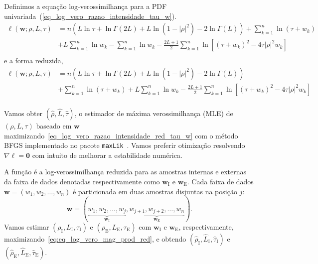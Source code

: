Definimos a equação log-verossimilhança para a PDF univariada~(\ref{eq_log_vero_razao_intensidade_tau_w}).
\begin{equation}\nonumber
\begin{split}
    \ell(\bm w;\rho, L, \tau)&=n\left(L\ln\tau + \ln\Gamma(2L)+L\ln(1-|\rho|^2)-2\ln\Gamma(L)\right)+\sum_{k=1}^{n}\ln(\tau+w_k)\\
                         &+L\sum_{k=1}^{n}\ln w_k-\sum_{k=1}^{n}\ln w_k-\frac{2L+1}{2}\sum_{k=1}^{n} \ln\left[(\tau+w_k)^2-4\tau|\rho|^2w_k\right]\\
\end{split}
 \end{equation}
e a forma reduzida,
\begin{equation}\label{eq_log_vero_razao_intensidade_red_tau_w}
\begin{split}
    \ell(\bm w;\rho, L, \tau)&=n\left(L\ln\tau +\ln\Gamma(2L)+L\ln(1-|\rho|^2)-2\ln\Gamma(L)\right)\\
                         &+\sum_{k=1}^{n}\ln(\tau+w_k)+L\sum_{k=1}^{n}\ln w_k-\frac{2L+1}{2}\sum_{k=1}^{n} \ln\left[(\tau+w_k)^2-4\tau|\rho|^2w_k\right]\\
\end{split}
 \end{equation} 

Vamos obter $(\widehat \rho, \widehat L, \widehat \tau)$, o estimador de máxima verossimilhança (MLE) de $(\rho, L, \tau)$ baseado em $\bm w$ maximizando~\eqref{eq_log_vero_razao_intensidade_red_tau_w} com o método BFGS implementado no pacote \texttt{maxLik}~\citep{ht}. Vamos preferir otimização resolvendo $\nabla\ell=\bm 0$ com intuito de melhorar a estabilidade numérica.

A função é a log-verossimilhança reduzida para as amostras internas e externas da faixa de dados denotadas respectivamente como $\bm w_\text{I}$ e $\bm w_\text{E}$. Cada faixa de dados $\bm w = (w_1,w_2,\dots,w_n)$ é particionada em duas amostras disjuntas na posição $j$:  
$$
\bm w = (\underbrace{w_1,w_2,\dots,w_j}_{\bm w_\text{I}}, 
\underbrace{w_{j+1}, w_{j+2},\dots,w_n}_{\bm w_\text{E}}).
$$
Vamos estimar $(\rho_\text{I},L_\text{I}, \tau_\text{I})$ e $(\rho_\text{E},L_\text{E}, \tau_\text{E})$ com $\bm w_\text{I}$ e $\bm w_\text{E}$, respectivamente, maximizando~\eqref{eq:eq_log_vero_mag_prod_red}, e obtendo $(\widehat{\rho}_\text{I}, \widehat{L}_\text{I}, \widehat{\tau}_\text{I})$ e $(\widehat{\rho}_\text{E}, \widehat{L}_\text{E}, \widehat{\tau}_\text{E})$.

